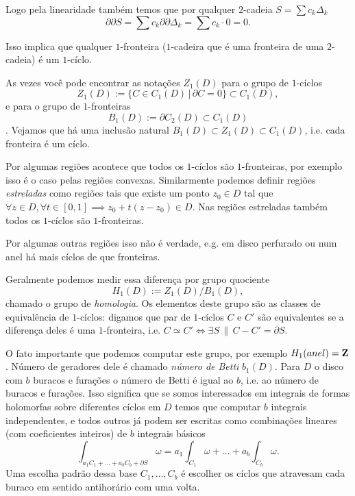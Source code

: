Logo pela linearidade também temos que por qualquer $2$-cadeia $S = \sum c_k \Delta_k$
\[ \partial \partial S = \sum c_k \partial \partial \Delta_k = \sum c_k \cdot 0 =  0. \]

Isso implica que qualquer $1$-fronteira ($1$-cadeira que é uma fronteira de uma $2$-cadeia) é um $1$-cíclo.

As vezes você pode encontrar as notações $Z_1(D)$ para o grupo de $1$-cíclos
\[ Z_1(D) := \{ C \in C_1(D) \,|\, \partial C = 0 \} \subset C_1(D), \]
e para o grupo de $1$-fronteiras
\[ B_1(D) := \partial C_2(D) \subset C_1(D) \].
Vejamos que há uma inclusão natural $B_1(D) \subset Z_1(D) \subset C_1(D)$,
i.e. cada fronteira é um cíclo.

Por algumas regiões acontece que todos os $1$-cíclos são $1$-fronteiras,
por exemplo isso é o caso pelas regiões convexas.
Similarmente podemos definir regiões \emph{estreladas} como regiões tais que existe um ponto $z_0 \in D$ tal que
$\forall z\in D, \forall t \in [0,1] \implies z_0 + t (z-z_0) \in D$. Nas regiões estreladas também
todos os $1$-cíclos são $1$-fronteiras.

Por algumas outras regiões isso não é verdade, e.g. em disco perfurado ou num anel há mais cíclos de que fronteiras.


Geralmente podemos medir essa diferença por grupo quociente
\[ H_1(D) := Z_1(D) / B_1(D), \] 
chamado o grupo de \emph{homologia}.
Os elementos deste grupo são as classes de equivalência de $1$-cíclos:
digamos que par de $1$-cíclos $C$ e $C'$ são equivalentes se a diferença deles é uma $1$-fronteira,
i.e. $C \simeq C' \iff \exists S \,\|\, C-C' = \partial S$.

O fato importante que podemos computar este grupo, por exemplo $H_1(anel) = \mathbf{Z}$.
Número de geradores dele é chamado \emph{número de Betti} $b_1(D)$.
Para $D$ o disco com $b$ buracos e furações o número de Betti é igual ao $b$,
i.e. ao número de buracos e furações. Isso significa que se somos interessados em integrais de formas holomorfas sobre
diferentes cíclos em $D$ temos que computar $b$ integrais independentes, e todos outros
já podem ser escritas como combinações lineares (com coeficientes inteiros) de $b$ integrais básicos
\[ \int_{a_1 C_1 + \dots + a_b C_b + \partial S} \omega = a_1 \int_{C_1} \omega + \dots + a_b \int_{C_b} \omega. \]
Uma escolha padrão dessa base $C_1,\dots,C_b$ é escolher os cíclos que atravesam cada buraco em sentido antihorário com uma volta.


